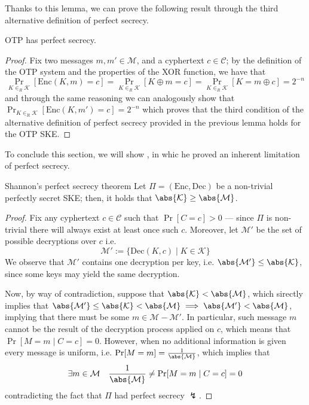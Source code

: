 \documentclass[a4paper, 12pt]{report}
\begin{document}
Thanks to this lemma, we can prove the following result through the third alternative definition of perfect secrecy.

\begin{framedthm}{}
	OTP has perfect secrecy.
\end{framedthm}

\begin{proof}
	Fix two messages $m, m' \in \mathcal M$, and a cyphertext $c \in \mathcal C$; by the definition of the OTP system and the properties of the XOR function, we have that $$\Pr_{K \in_R \mathcal K}[\mathrm{Enc}(K, m) = c] = \Pr_{K \in_R \mathcal K}[K \oplus m = c] = \Pr_{K \in_R \mathcal K}[K = m \oplus c] = 2^{-n}$$ and through the same reasoning we can analogously show that $\Pr_{K \in_R \mathcal K}[\mbox{Enc}(K, m') = c] = 2^{-n}$ which proves that the third condition of the alternative definition of perfect secrecy provided in the previous lemma holds for the OTP SKE.
\end{proof}

To conclude this section, we will show , in whic he proved an inherent limitation of perfect secrecy.

\begin{framedthm}{Shannon's perfect secrecy theorem}
	Let $\Pi = (\mbox{Enc}, \mbox{Dec})$ be a non-trivial perfectly secret SKE; then, it holds that $\abs{\mathcal K} \ge \abs{\mathcal M}$.
\end{framedthm}

\begin{proof}
	Fix any cyphertext $c \in \mathcal C$ such that $\Pr[C = c] > 0$ --- since $\Pi$ is non-trivial there will always exist at least once such $c$. Moreover, let $\mathcal M'$ be the set of possible decryptions over $c$ i.e. $$\mathcal M' := \{\mbox{Dec}(K, c) \mid K \in \mathcal K\}$$ We observe that $\mathcal M'$ contains  one decryption per key, i.e. $\abs{\mathcal M'} \le \abs{\mathcal K}$, since some keys may yield the same decryption.

	Now, by way of contradiction, suppose that $\abs{\mathcal K} < \abs{\mathcal M}$, which sirectly implies that $\abs{\mathcal M'} \le \abs{\mathcal K} < \abs{\mathcal M} \implies \abs{\mathcal M'} < \abs{\mathcal M}$, implying that there must be some $m \in \mathcal M - \mathcal M'$. In particular, such message $m$ cannot be the result of the decryption process applied on $c$, which means that $\Pr[M = m \mid C = c] = 0$. However, when no additional information is given every message is uniform, i.e. $\Pr[M = m] = \tfrac{1}{\abs{\mathcal M}}$, which implies that $$\exists m \in \mathcal M \quad \dfrac{1}{\abs{\mathcal M}} \neq \Pr[M = m \mid C = c] = 0$$ contradicting the fact that $\Pi$ had perfect secrecy $\lightning$.
\end{proof}
\end{document}
